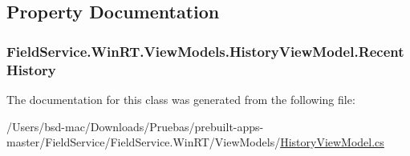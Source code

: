 \subsection{Property Documentation}
\hypertarget{class_field_service_1_1_win_r_t_1_1_view_models_1_1_history_view_model_a859bff3fef3349721f15989cc91c2531}{
\subsubsection[{Recent\+History}]{ Field\+Service.\+Win\+R\+T.\+View\+Models.\+History\+View\+Model.\+Recent\+History\hspace{0.3cm}{\ttfamily [get]}}}\label{class_field_service_1_1_win_r_t_1_1_view_models_1_1_history_view_model_a859bff3fef3349721f15989cc91c2531}


The documentation for this class was generated from the following file\+:\begin{DoxyCompactItemize}
\item 
/\+Users/bsd-\/mac/\+Downloads/\+Pruebas/prebuilt-\/apps-\/master/\+Field\+Service/\+Field\+Service.\+Win\+R\+T/\+View\+Models/\hyperlink{_win_r_t_2_view_models_2_history_view_model_8cs}{History\+View\+Model.\+cs}\end{DoxyCompactItemize}
